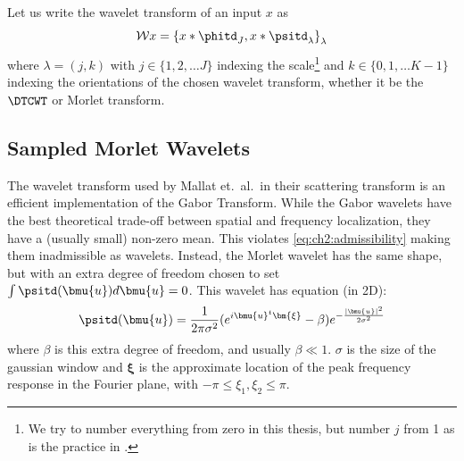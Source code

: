 Let us write the wavelet transform of an input $x$ as
\begin{equation}
  \mathcal{W}x = \left\{x \ast \phitd_J, x \ast \psitd_{\lambda} \right\}_{\lambda} \label{eq:ch2:wave2}
\end{equation}
where $\lambda = (j,k)$ with $j\in \{1, 2,\ldots J\}$ indexing the
scale\footnote{We try to number everything from zero in this thesis, but number
$j$ from 1 as is the practice in \cite{kingsbury_complex_2001,
selesnick_dual-tree_2005}.} and $k \in \{0, 1, \ldots K-1\}$ indexing the
orientations of the chosen wavelet transform, whether it be the $\DTCWT$ or
Morlet transform.

\subsection{Sampled Morlet Wavelets}\label{sec:ch2:morlet_fourier}
  The wavelet transform used by Mallat et.\ al.\ in their scattering transform is an efficient
  implementation of the Gabor Transform.  While the Gabor wavelets have the best
  theoretical trade-off between spatial and frequency localization, they have a
  (usually small) non-zero mean.  This violates \eqref{eq:ch2:admissibility} making them
  inadmissible as wavelets. Instead, the Morlet wavelet has the same shape, but
  with an extra degree of freedom chosen to set $\int \psitd (\bmu{u}) d\bmu{u}
  =0$. This wavelet has equation (in 2D):
  \begin{equation}
    \psitd(\bmu{u}) = \frac{1}{2\pi\sigma^2} {(e^{i\bmu{u}^t\bm{\xi}} - \beta)}
                     e^{-\frac{|\bmu{u}|^2}{2\sigma^2}}
    \label{eq:ch2:morlet}
  \end{equation}
  where $\beta$ is this extra degree of freedom, and usually $\beta\ll 1$.
  $\sigma$ is the size of the gaussian window and $\bm{\xi}$ is the
  approximate location of the peak frequency response in the Fourier plane, with
  $-\pi \leq \xi_1, \xi_2 \leq \pi$.

